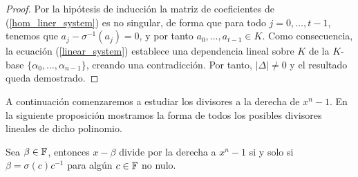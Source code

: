 \begin{proof}
Por la hipótesis de inducción la matriz de coeficientes de (\ref{hom_liner_system}) es no singular, de forma que para todo \(j = 0, \dots, t-1\), tenemos que \(a_j - \sigma^{-1}(a_j) = 0\), y por tanto \(a_0, \dots, a_{t-1} \in K\). Como consecuencia, la ecuación (\ref{linear_system}) establece una dependencia lineal sobre  \(K\) de la  \(K\)-base  \(\{\alpha_0, \dots, \alpha_{n-1}\}\), creando una contradicción. Por tanto, \(|\Delta| \neq 0\) y el resultado queda demostrado.
\end{proof}

A continuación comenzaremos a estudiar los divisores a la derecha de \(x^{n} -1\). En la siguiente proposición mostramos la forma de todos los posibles divisores lineales de dicho polinomio.

\begin{proposition}
\label{prop:linear_div}
    Sea \(\beta \in \mathbb{F}\), entonces \(x - \beta\) divide por la derecha a \(x^{n}-1\) si y solo si \(\beta = \sigma(c)c^{-1}\) para algún \(c \in \mathbb{F}\) no nulo.
\end{proposition}

